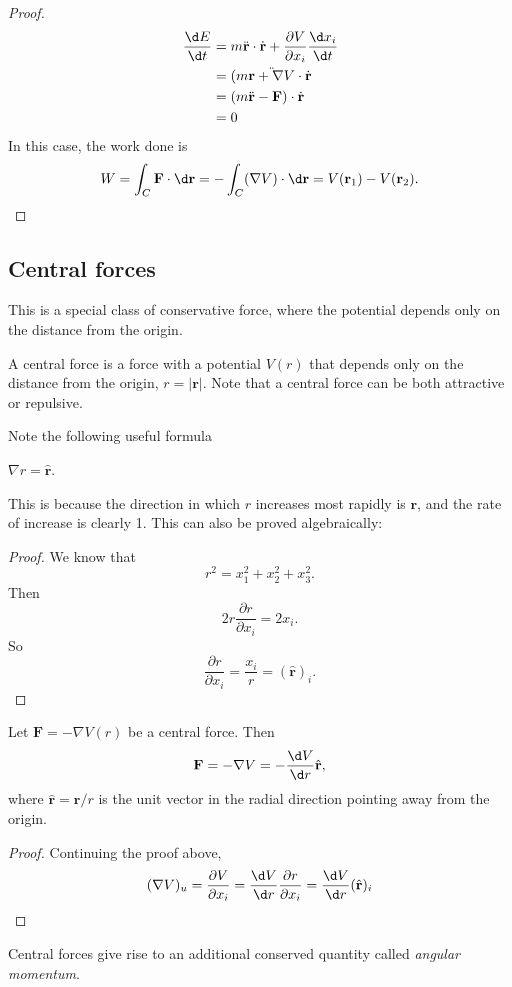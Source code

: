 \documentclass[a4paper]{article}
\begin{document}
\begin{proof}
  \begin{align*}
    \frac{\d E}{\d t} &= m\ddot{\mathbf{r}}\cdot \dot{\mathbf{r}} + \frac{\partial V}{\partial x_i}\frac{\d x_i}{\d t}\\
    &= (m\ddot{\mathbf{r} + \nabla V}\cdot \dot{\mathbf{r}}\\
    &= (m\ddot{\mathbf{r}} - \mathbf{F})\cdot \dot{\mathbf{r}}\\
    &= 0
  \end{align*}
  In this case, the work done is
  \[
    W = \int_C \mathbf{F}\cdot \d \mathbf{r} = -\int_C (\nabla V)\cdot \d \mathbf{r} = V(\mathbf{r}_1) - V(\mathbf{r}_2).
  \]
\end{proof}
\subsection{Central forces}
This is a special class of conservative force, where the potential depends only on the distance from the origin.
\begin{defi}
  A central force is a force with a potential $V(r)$ that depends only on the distance from the origin, $r = |\mathbf{r}|$. Note that a central force can be both attractive or repulsive.
\end{defi}

Note the following useful formula
\begin{prop}
  $\nabla r = \hat{\mathbf{r}}$. 
\end{prop}
This is because the direction in which $r$ increases most rapidly is $\mathbf{r}$, and the rate of increase is clearly 1. This can also be proved algebraically:

\begin{proof}
  We know that
  \[
    r^2 = x_1^2 + x_2^2 + x_3^2.
  \]
  Then
  \[
    2r\frac{\partial r}{\partial x_i} = 2x_i.
  \]
  So
  \[
    \frac{\partial r}{\partial x_i} = \frac{x_i}{r} = (\hat{\mathbf{r}})_i.
  \]
\end{proof}

\begin{prop}
  Let $\mathbf{F} = -\nabla V(r)$ be a central force. Then
  \[
    \mathbf{F} = -\nabla V = -\frac{\d V}{\d r} \hat{\mathbf{r}},
  \]
  where $\hat{\mathbf{r}} = \mathbf{r}/r$ is the unit vector in the radial direction pointing away from the origin.
\end{prop}

\begin{proof}
  Continuing the proof above,
  \[
    (\nabla V)_u = \frac{\partial V}{\partial x_i} = \frac{\d V}{\d r} \frac{\partial r}{\partial x_i} = \frac{\d V}{\d r}(\hat{\mathbf{r}})_i
  \]
\end{proof}
Central forces give rise to an additional conserved quantity called \emph{angular momentum}.
\end{document}
